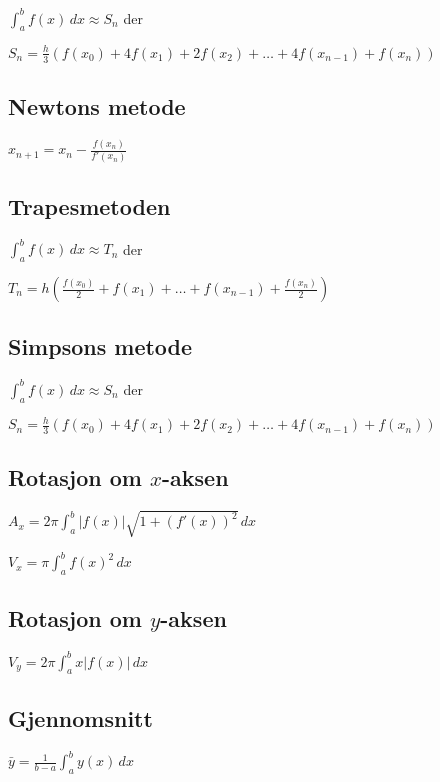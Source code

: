 \documentclass[a4paper,7pt,fleqn]{article}
\begin{document}
\begin{multicols}{2}
\(\int_{a}^{b} f(x) \,dx \approx S_n\) der  

\( S_n = \frac{h}{3} \left( f(x_0) + 4f(x_1) + 2f(x_2) + \dots + 4f(x_{n-1}) + f(x_n) \right) \)  



\subsection{Newtons metode}  

\( x_{n+1} = x_n - \frac{f(x_n)}{f'(x_n)} \)  



\subsection{Trapesmetoden}  

\(\int_{a}^{b} f(x) \,dx \approx T_n\) der  

\( T_n = h \left( \frac{f(x_0)}{2} + f(x_1) + \dots + f(x_{n-1}) + \frac{f(x_n)}{2} \right) \)  

\subsection{Simpsons metode}  

\(\int_{a}^{b} f(x) \,dx \approx S_n\) der  

\( S_n = \frac{h}{3} \left( f(x_0) + 4f(x_1) + 2f(x_2) + \dots + 4f(x_{n-1}) + f(x_n) \right) \)  

\subsection{Rotasjon om \(x\)-aksen}  

\( A_x = 2\pi \int_{a}^{b} |f(x)| \sqrt{1 + (f'(x))^2} \,dx \)  

\( V_x = \pi \int_{a}^{b} f(x)^2 \,dx \)  

\subsection{Rotasjon om \(y\)-aksen}  

\( V_y = 2\pi \int_{a}^{b} x |f(x)| \,dx \)  

\subsection{Gjennomsnitt}  

\( \bar{y} = \frac{1}{b-a} \int_{a}^{b} y(x) \,dx \)  


\end{multicols}
\end{document}
